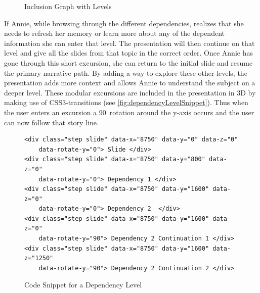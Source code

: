 \documentclass[twoside, 12pt]{article}
\begin{document}
\begin{figure}
\vspace{0pt}
  \begin{center}
\vspace{-20pt}
  \caption{Inclusion Graph with Levels}
  \label{fig:levelsGraph}
\vspace{12pt}
  \end{center}
\end{figure}

\begin{figure}
\vspace{-50pt}
\end{figure}

If Annie, while browsing through the different dependencies, realizes that she needs to refresh her memory or learn more about any of the dependent information she can enter that level. The presentation will then continue on that level and give all the slides from that topic in the correct order. Once Annie has gone through this short excursion, she can return to the initial slide and resume the primary narrative path. By adding a way to explore these other levels, the presentation adds more context and allows Annie to understand the subject on a deeper level. These modular excursions are included in the presentation in 3D by making use of CSS3-transitions (see \autoref{fig:dependencyLevelSnippet}). Thus when the user enters an excursion a 90\degree\ rotation around the y-axis occurs and the user can now follow that story line.\\

\begin{figure}
\vspace{0pt}
\begin{verbatim}
<div class="step slide" data-x="8750" data-y="0" data-z="0"
	data-rotate-y="0"> Slide </div>
<div class="step slide" data-x="8750" data-y="800" data-z="0"
	data-rotate-y="0"> Dependency 1 </div>
<div class="step slide" data-x="8750" data-y="1600" data-z="0" 
	data-rotate-y="0"> Dependency 2  </div>
<div class="step slide" data-x="8750" data-y="1600" data-z="0" 
	data-rotate-y="90"> Dependency 2 Continuation 1 </div>
<div class="step slide" data-x="8750" data-y="1600" data-z="1250" 
	data-rotate-y="90"> Dependency 2 Continuation 2 </div>
\end{verbatim}
\vspace{-8pt}
  \caption{Code Snippet for a Dependency Level}
  \label{fig:dependencyLevelSnippet}
  \vspace{12pt}
\end{figure}
\end{document}
